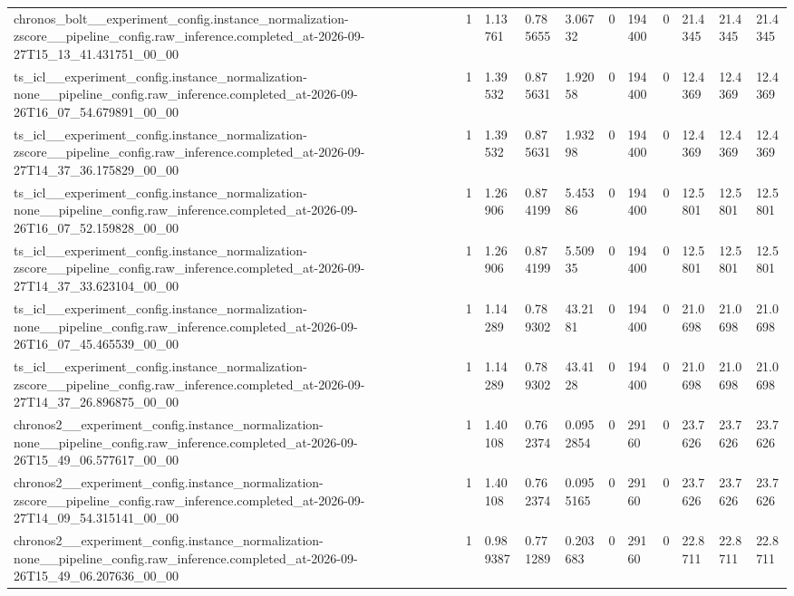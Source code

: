 \begin{tabular}{lllllllllll}
chronos\_bolt\_\_experiment\_config.instance\_normalization-zscore\_\_pipeline\_config.raw\_inference.completed\_at-2026-09-27T15\_13\_41.431751\_00\_00 & 1 & 1.13761 & 0.785655 & 3.06732 & 0 & 194400 & 0 & 21.4345 & 21.4345 & 21.4345 \\
ts\_icl\_\_experiment\_config.instance\_normalization-none\_\_pipeline\_config.raw\_inference.completed\_at-2026-09-26T16\_07\_54.679891\_00\_00 & 1 & 1.39532 & 0.875631 & 1.92058 & 0 & 194400 & 0 & 12.4369 & 12.4369 & 12.4369 \\
ts\_icl\_\_experiment\_config.instance\_normalization-zscore\_\_pipeline\_config.raw\_inference.completed\_at-2026-09-27T14\_37\_36.175829\_00\_00 & 1 & 1.39532 & 0.875631 & 1.93298 & 0 & 194400 & 0 & 12.4369 & 12.4369 & 12.4369 \\
ts\_icl\_\_experiment\_config.instance\_normalization-none\_\_pipeline\_config.raw\_inference.completed\_at-2026-09-26T16\_07\_52.159828\_00\_00 & 1 & 1.26906 & 0.874199 & 5.45386 & 0 & 194400 & 0 & 12.5801 & 12.5801 & 12.5801 \\
ts\_icl\_\_experiment\_config.instance\_normalization-zscore\_\_pipeline\_config.raw\_inference.completed\_at-2026-09-27T14\_37\_33.623104\_00\_00 & 1 & 1.26906 & 0.874199 & 5.50935 & 0 & 194400 & 0 & 12.5801 & 12.5801 & 12.5801 \\
ts\_icl\_\_experiment\_config.instance\_normalization-none\_\_pipeline\_config.raw\_inference.completed\_at-2026-09-26T16\_07\_45.465539\_00\_00 & 1 & 1.14289 & 0.789302 & 43.2181 & 0 & 194400 & 0 & 21.0698 & 21.0698 & 21.0698 \\
ts\_icl\_\_experiment\_config.instance\_normalization-zscore\_\_pipeline\_config.raw\_inference.completed\_at-2026-09-27T14\_37\_26.896875\_00\_00 & 1 & 1.14289 & 0.789302 & 43.4128 & 0 & 194400 & 0 & 21.0698 & 21.0698 & 21.0698 \\
chronos2\_\_experiment\_config.instance\_normalization-none\_\_pipeline\_config.raw\_inference.completed\_at-2026-09-26T15\_49\_06.577617\_00\_00 & 1 & 1.40108 & 0.762374 & 0.0952854 & 0 & 29160 & 0 & 23.7626 & 23.7626 & 23.7626 \\
chronos2\_\_experiment\_config.instance\_normalization-zscore\_\_pipeline\_config.raw\_inference.completed\_at-2026-09-27T14\_09\_54.315141\_00\_00 & 1 & 1.40108 & 0.762374 & 0.0955165 & 0 & 29160 & 0 & 23.7626 & 23.7626 & 23.7626 \\
chronos2\_\_experiment\_config.instance\_normalization-none\_\_pipeline\_config.raw\_inference.completed\_at-2026-09-26T15\_49\_06.207636\_00\_00 & 1 & 0.989387 & 0.771289 & 0.203683 & 0 & 29160 & 0 & 22.8711 & 22.8711 & 22.8711 \\

\end{tabular}
